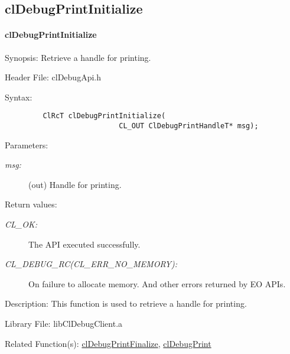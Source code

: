 \subsection{clDebugPrintInitialize}
\hypertarget{pagedbg106}{}\paragraph{cl\-Debug\-Print\-Initialize}\label{pagedbg106}
\begin{Desc}
\item[Synopsis:]Retrieve a handle for printing.\end{Desc}
\begin{Desc}
\item[Header File:]clDebugApi.h\end{Desc}
\begin{Desc}
\item[Syntax:]

\footnotesize\begin{verbatim}         ClRcT clDebugPrintInitialize(
                           CL_OUT ClDebugPrintHandleT* msg);
\end{verbatim}
\normalsize
\end{Desc}
\begin{Desc}
\item[Parameters:]
\begin{description}
\item[{\em msg:}](out) Handle for printing.\end{description}
\end{Desc}
\begin{Desc}
\item[Return values:]
\begin{description}
\item[{\em CL\_\-OK:}]The API executed successfully. \item[{\em CL\_\-DEBUG\_\-RC(CL\_\-ERR\_\-NO\_\-MEMORY):}]On failure to allocate memory. And other errors returned by EO APIs.\end{description}
\end{Desc}
\begin{Desc}
\item[Description:]This function is used to retrieve a handle for printing.\end{Desc}
\begin{Desc}
\item[Library File:]lib\-Cl\-Debug\-Client.a\end{Desc}
\begin{Desc}
\item[Related Function(s):]\hyperlink{pagedbg108}{cl\-Debug\-Print\-Finalize}, \hyperlink{pagedbg107}{cl\-Debug\-Print} \end{Desc}
\newpage


